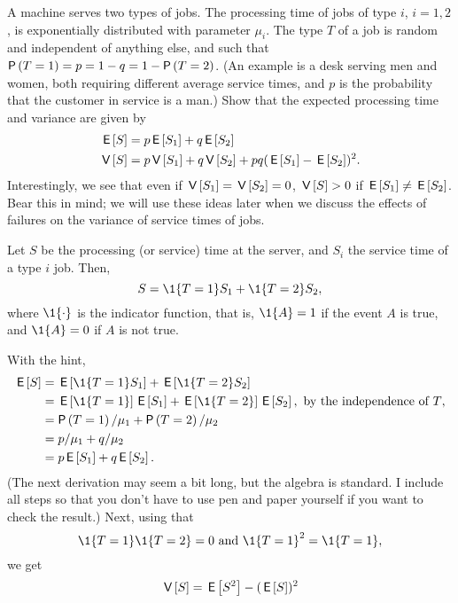 \begin{extra}\label{ex:49}
  A machine serves two types of jobs.
  The processing time of jobs of type $i$, $i=1,2$, is exponentially distributed with parameter $\mu_i$.
  The type $T$ of a job is random and independent of anything else, and such that $\P{T=1} = p = 1-q = 1-\P{T=2}$.
  (An example is a desk serving men and women, both requiring different average service times, and $p$ is the probability that the customer in service is a man.)
  Show that the expected processing time and variance are given by
\begin{align*}
  \,\mathsf{E}\left[S\right] &= p \,\mathsf{E}\left[S_1\right]  + q \,\mathsf{E}\left[S_2\right] \\
\,\mathsf{V}\left[S\right] &= p \,\mathsf{V}\left[S_1\right] + q \,\mathsf{V}\left[S_2\right] + pq(\,\mathsf{E}\left[S_1\right] - \,\mathsf{E}\left[S_2\right])^2.
  \end{align*}
Interestingly, we see that even if $\,\mathsf{V}\left[S_1\right] = \,\mathsf{V}\left[S_2\right] = 0$, $\,\mathsf{V}\left[S\right] > 0$
if $\,\mathsf{E}\left[S_1\right] \neq \,\mathsf{E}\left[S_2\right]$. Bear this in mind; we will use these ideas
later when we discuss the effects of failures on the variance of
service times of jobs.
\begin{hint}
    Let $S$ be the processing (or service) time at the server, and
    $S_i$ the service time of a type $i$ job. Then, 
    \begin{equation*}
      S = \1{T=1} S_1 + \1{T=2} S_2,
    \end{equation*}
    where $\1{\cdot}$ is the indicator function, that is, $\1{A}=1$ if the
    event $A$ is true, and $\1{A}=0$ if $A$ is not true.   
\end{hint}
  \begin{solution}
With the hint, 
\begin{align*}
  \E S 
&= \E{\1{T=1} S_1} + \E{\1{T=2} S_2} \\
&= \E{\1{T=1}} \E{ S_1} + \E{\1{T=2}} \E{S_2}, \text{ by the independence of $T$}, \\
&= \P{T=1} /\mu_1 + \P{T=2}/ \mu_2 \\
&= p /\mu_1 + q/ \mu_2 \\
&= p \E{S_1}  + q \E{S_2}.
\end{align*}
(The next derivation may seem a bit long, but the algebra is
standard. I include all steps so that you don't have to use pen and
paper yourself if you want to check the result.) Next, using that
\begin{equation*}
\1{T=1}\1{T=2} = 0 \text{ and } \1{T=1}^2 = \1{T=1},
\end{equation*}
we get
\begin{align*}
  \V S 
&= \E{S^2} - (\E S)^2 \\

\end{align*}
\end{solution}
\end{extra}

